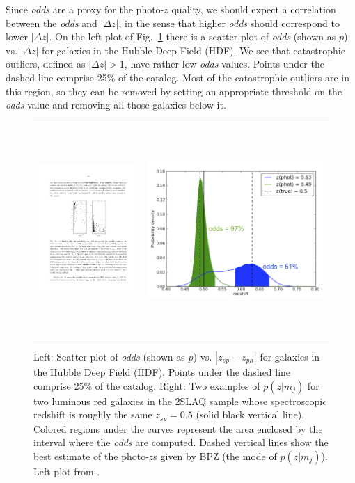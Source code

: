 Since \textit{odds} are a proxy for the photo-$z$ quality, we should expect a correlation between the \textit{odds} and $|\Delta z|$, in the sense that higher \textit{odds} should correspond to lower $|\Delta z|$. On the left plot of Fig.~\ref{fig:odds} there is a scatter plot of \textit{odds} (shown as $p$) vs. $|\Delta z|$ for galaxies in the Hubble Deep Field (HDF). We see that catastrophic outliers, defined as $|\Delta z|>1$, have rather low \textit{odds} values. Points under the dashed line comprise 25\% of the catalog. Most of the catastrophic outliers are in this region, so they can be removed by setting an appropriate threshold on the \textit{odds} value and removing all those galaxies below it.
\begin{figure}
\centering
\begin{tabular}{cc}
\includegraphics[height=76mm]{./plots/odds.pdf} & \includegraphics[height=80mm]{./plots/odds_example.png}
\end{tabular}
\caption{Left: Scatter plot of \textit{odds} (shown as $p$) vs. $|z_{sp}-z_{ph}|$ for galaxies in the Hubble Deep Field (HDF). Points under the dashed line comprise 25\% of the catalog. Right: Two examples of $p(z|m_j)$ for two luminous red galaxies in the 2SLAQ sample whose spectroscopic redshift is roughly the same $z_{sp} = 0.5$ (solid black vertical line). Colored regions under the curves represent the area enclosed by the interval where the \textit{odds} are computed. Dashed vertical lines show the best estimate of the photo-$z$s given by BPZ (the mode of $p(z|m_j)$). Left plot from \citet{Benitez2000}.}
\label{fig:odds}
\end{figure}
